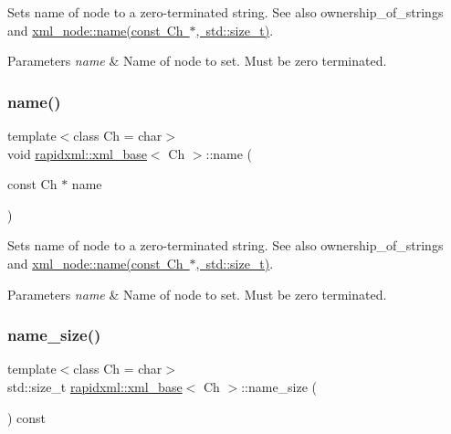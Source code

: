 Sets name of node to a zero-\/terminated string. See also ownership\+\_\+of\+\_\+strings and \mbox{\hyperlink{classrapidxml_1_1xml__base_ae55060ae958c6e6465d6c8db852ec6ce}{xml\+\_\+node\+::name(const Ch $\ast$, std\+::size\+\_\+t)}}. 
\begin{DoxyParams}{Parameters}
{\em name} & Name of node to set. Must be zero terminated. \\
\hline
\end{DoxyParams}
\mbox{\label{classrapidxml_1_1xml__base_a4611ddc82ac83a527c65606600eb2a0d}} 
\subsubsection{\texorpdfstring{name()}{name()}\hspace{0.1cm}{\footnotesize\ttfamily [6/6]}}
{\footnotesize\ttfamily template$<$class Ch  = char$>$ \\
void \mbox{\hyperlink{classrapidxml_1_1xml__base}{rapidxml\+::xml\+\_\+base}}$<$ Ch $>$\+::name (\begin{DoxyParamCaption}\item[{const Ch $\ast$}]{name }\end{DoxyParamCaption})\hspace{0.3cm}{\ttfamily [inline]}}

Sets name of node to a zero-\/terminated string. See also ownership\+\_\+of\+\_\+strings and \mbox{\hyperlink{classrapidxml_1_1xml__base_ae55060ae958c6e6465d6c8db852ec6ce}{xml\+\_\+node\+::name(const Ch $\ast$, std\+::size\+\_\+t)}}. 
\begin{DoxyParams}{Parameters}
{\em name} & Name of node to set. Must be zero terminated. \\
\hline
\end{DoxyParams}
\mbox{\label{classrapidxml_1_1xml__base_a20c8ffbe0c7a0b4231681ab8b99330a4}} 
\subsubsection{\texorpdfstring{name\+\_\+size()}{name\_size()}\hspace{0.1cm}{\footnotesize\ttfamily [1/2]}}
{\footnotesize\ttfamily template$<$class Ch  = char$>$ \\
std\+::size\+\_\+t \mbox{\hyperlink{classrapidxml_1_1xml__base}{rapidxml\+::xml\+\_\+base}}$<$ Ch $>$\+::name\+\_\+size (\begin{DoxyParamCaption}{ }\end{DoxyParamCaption}) const\hspace{0.3cm}{\ttfamily [inline]}}

